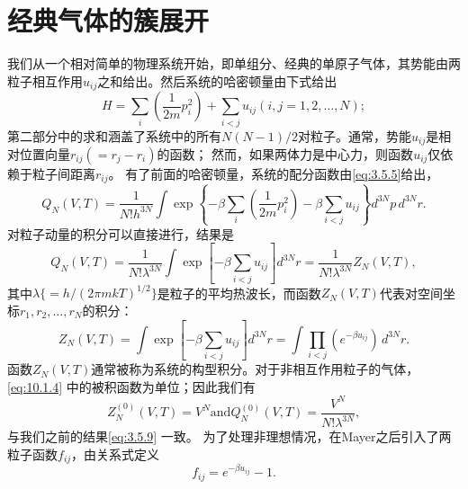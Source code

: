 \section{经典气体的簇展开}\label{ux7ecfux5178ux6c14ux4f53ux7684ux7c07ux5c55ux5f00}
我们从一个相对简单的物理系统开始，即单组分、经典的单原子气体，其势能由两粒子相互作用\(u_{ij}\)之和给出。然后系统的哈密顿量由下式给出
\begin{equation}\tag{10.1.1}\label{eq:10.1.1}
H = \sum _ { i } \left( \frac { 1 } { 2 m } p _ { i } ^{2} \right) + \sum _ { i < j } u _ { i j }  ( i , j = 1 , 2 , \ldots , N ) ;
\end{equation}
第二部分中的求和涵盖了系统中的所有\(N(N-1)/2\)对粒子。通常，势能\(u_{ij}\)是相对位置向量\(r_{ij}(=r_j - r_i)\)的函数；
然而，如果两体力是中心力，则函数\(u_{ij}\)仅依赖于粒子间距离\(r_{ij}\)。
有了前面的哈密顿量，系统的配分函数由\autoref{eq:3.5.5}给出，
\begin{equation}\tag{10.1.2}\label{eq:10.1.2}
Q _ { N } ( V , T ) = \frac { 1 } { N ! h ^{3 N} } \int \exp \left\{ - \beta \sum _ { i } \left( \frac { 1 } { 2 m } p _ { i } ^{2} \right) - \beta \sum _ { i < j } u _ { i j } \right\} d ^{3 N} p \, d ^{3 N} r .
\end{equation}
对粒子动量的积分可以直接进行，结果是
\begin{equation}\tag{10.1.3}\label{eq:10.1.3}
Q _ { N } ( V , T ) = \frac { 1 } { N ! \lambda ^{3 N} } \int \exp \left[ - \beta \sum _ { i < j } u _ { i j } \right] d ^{3 N} r = \frac { 1 } { N ! \lambda ^{3 N} } Z _ { N } ( V , T ) ,
\end{equation}
其中\(\lambda\{=h/(2\pi mkT)^{1/2}\}\)是粒子的平均热波长，而函数\(Z_{N}(V,T)\)代表对空间坐标\(r_{1},r_{2},\ldots,r_{N}\)的积分：
\begin{equation}\tag{10.1.4}\label{eq:10.1.4}
Z _ { N } ( V , T ) = \int \exp \left[ - \beta \sum _ { i < j } u _ { i j } \right] d ^{3 N} r = \int \prod _ { i < j } ( e ^{- \beta u _ { i j} } ) \, d ^{3 N} r .
\end{equation}
函数\(Z_{N}(V,T)\)通常被称为系统的构型积分。对于非相互作用粒子的气体，\autoref{eq:10.1.4} 中的被积函数为单位；因此我们有
\begin{equation}\tag{10.1.5}\label{eq:10.1.5}
Z _ { N } ^{( 0 )} ( V , T ) = V ^{N}  \mathrm { a n d }  Q _ { N } ^{( 0 )} ( V , T ) = \frac { V ^{N} } { N ! \lambda ^{3 N} } ,
\end{equation}
与我们之前的结果\autoref{eq:3.5.9} 一致。
为了处理非理想情况，在Mayer之后引入了两粒子函数\(f_{ij}\)，由关系式定义
\begin{equation}\tag{10.1.6}\label{eq:10.1.6}
f _ { i j } = e ^{- \beta u _ { i j} } - 1 .
\end{equation}
